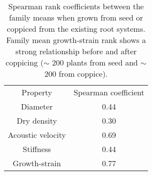 
\begin{table} 
\centering
    \begin{tabular}{ c c }
Property          & Spearman coefficient \\
Diameter          & 0.44                 \\
Dry density       & 0.30                 \\
Acoustic velocity & 0.69                 \\
Stiffness         & 0.44                 \\
Growth-strain     & 0.77  
    \end{tabular} 
    \caption{Spearman rank coefficients between the family means when grown from seed or coppiced from the existing root systems. Family mean growth-strain rank shows a strong relationship before and after coppicing (\(\sim\) 200 plants from seed and \(\sim\) 200 from coppice). } 
\end{table}